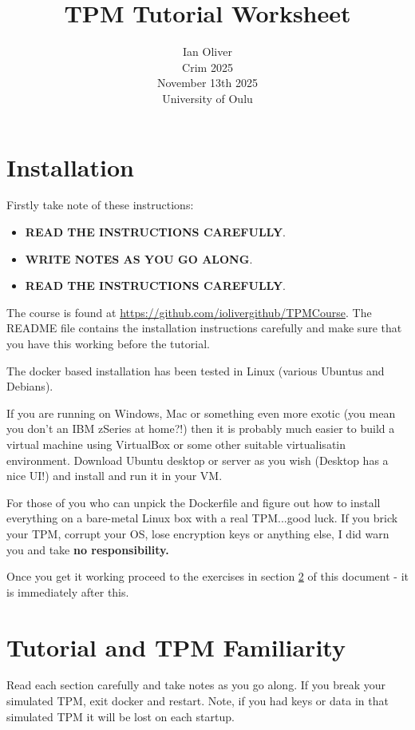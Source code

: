 \documentclass[11pt,a4paper]{article}
\begin{document}
\title{TPM Tutorial Worksheet}
\author{Ian Oliver\\Crim 2025\\November 13th 2025\\University of Oulu}
\date{}

\maketitle

\tableofcontents


\section{Installation}
Firstly take note of these instructions:
\begin{itemize}
 \item \textbf{READ THE INSTRUCTIONS CAREFULLY}.
 \item \textbf{WRITE NOTES AS YOU GO ALONG}.
 \item \textbf{READ THE INSTRUCTIONS CAREFULLY}.
 \end{itemize}

The course is found at \url{https://github.com/iolivergithub/TPMCourse}. The README file contains the installation instructions carefully and make sure that you have this working before the tutorial.

The docker based installation has been tested in Linux (various Ubuntus and Debians).

If you are running on Windows, Mac or something even more exotic (you mean you don't an IBM zSeries at home?!) then it is probably much easier to build a virtual machine using VirtualBox or some other suitable virtualisatin environment. Download Ubuntu desktop or server as you wish (Desktop has a nice UI!) and install and run it in your VM.

For those of you who can unpick the Dockerfile and figure out how to install everything on a bare-metal Linux box with a real TPM...good luck. If you brick your TPM, corrupt your OS, lose encryption keys or anything else, I did warn you and take \textbf{no responsibility.}

Once you get it working proceed to the exercises in section \ref{theexercises} of this document - it is immediately after this.



\section{Tutorial and TPM Familiarity}\label{theexercises}
Read each section carefully and take notes as you go along. If you break your simulated TPM, exit docker and restart. Note, if you had keys or data in that simulated TPM it will be lost on each startup.
\end{document}
